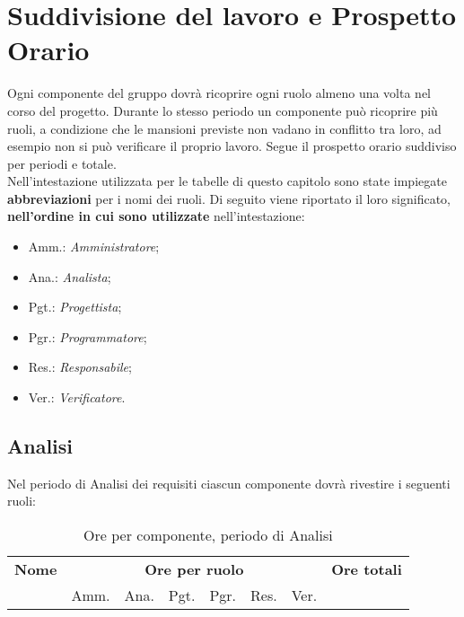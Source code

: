 
\section{Suddivisione del lavoro e Prospetto Orario} 


Ogni componente del gruppo dovrà ricoprire ogni ruolo almeno una volta nel corso del progetto.
Durante lo stesso periodo un componente può ricoprire più ruoli, a condizione che le mansioni previste non vadano in conflitto tra loro, ad esempio non si può verificare il proprio lavoro.
Segue il prospetto orario suddiviso per periodi e totale. \\

Nell'intestazione utilizzata per le tabelle di questo capitolo sono state impiegate \textbf{abbreviazioni} per i nomi dei ruoli.
Di seguito viene riportato il loro significato, \textbf{nell'ordine in cui sono utilizzate} nell'intestazione:
\begin{itemize}
\item Amm.: \textit{Amministratore};
\item Ana.: \textit{Analista};
\item Pgt.: \textit{Progettista};
\item Pgr.: \textit{Programmatore};
\item Res.: \textit{Responsabile};
\item Ver.: \textit{Verificatore}.
\end{itemize}

\pagebreak
\subsection{Analisi}

Nel periodo di Analisi dei requisiti ciascun componente dovrà rivestire i seguenti ruoli:
\noindent
\begin{table}[H]
\begin{tabular}{lccccccc}
\toprule
    \textbf{Nome}  & \multicolumn{6}{c}{\textbf{Ore per ruolo}} & \textbf{Ore totali} \\
     & Amm. & Ana. & Pgt. & Pgr. & Res. & Ver. & \\
    \midrule
    
    	
    
    \bottomrule
\end{tabular}
\caption{Ore per componente, periodo di Analisi}
\end{table}

